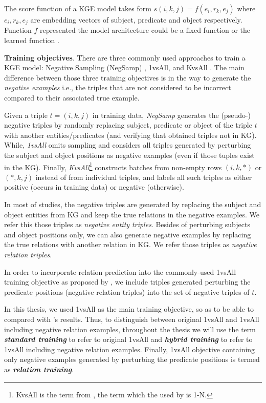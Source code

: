 The score function of a KGE model takes form $s(i,k,j) = f(e_i, r_k, e_j)$ where $e_i, r_k, e_j$ are embedding vectors of subject, predicate and object respectively. Function $f$ represented the model architecture could be a fixed function or the learned function \citep{Ruffinelli2020You}. 
\newline


\noindent\textbf{Training objectives}. There are three commonly used approaches to train a KGE model: Negative Sampling (NegSamp) \citep{bordes2013translating}, 1vsAll, \citep{lacroix2018canonical} and KvsAll \citep{dettmers2018conve}. The main difference between those three training objectives is in the way to generate the \textit{negative examples} i.e., the triples that are not considered to be incorrect compared to their associated true example. 

Given a triple $t = (i,k,j)$ in training data, \textit{NegSamp} generates the (pseudo-) negative triples by randomly replacing subject, predicate or object of the triple $t$ with another entities/predicates (and verifying that obtained triples not in KG). While, \textit{1vsAll} omits sampling and considers all triples generated by perturbing the subject and object positions as negative examples (even if those tuples exist in the KG). Finally, \textit{KvsAll}\footnote{KvsAll is the term from \citet{Ruffinelli2020You}, the term which the used by \citet{dettmers2018conve} is 1-N.} constructs batches from non-empty rows $(i,k,*)$ or $(*,k,j)$ instead of from individual triples, and labels all such triples as either positive (occurs in training data) or negative (otherwise).

In most of studies, the negative triples are generated by replacing the subject and object entities from KG and keep the true relations in the negative examples. We refer this those triples as \textit{negative entity triples}. Besides of perturbing subjects and object positions only, we can also generate negative examples by replacing the true relations with another relation in KG. We refer those triples as \textit{negative relation triples}.

In order to incorporate relation prediction into the commonly-used 1vsAll training objective as proposed by \cite{chen2021relation}, we include triples generated perturbing the predicate positions (negative relation triples) into the set of negative triples of $t$. 
 
In this thesis, we used 1vsAll as the main training objective, so as to be able to compared with \citet{chen2021relation}'s results. Thus, to distinguish between original 1vsAll and 1vsAll including negative relation examples, throughout the thesis we will use the term \textbf{\textit{standard training}} to refer to original 1vsAll and \textbf{\textit{hybrid training}} to refer to 1vsAll including negative relation examples. Finally, 1vsAll objective containing only negative examples generated by perturbing the predicate positions is termed as \textbf{\textit{relation training}}.
\newline

